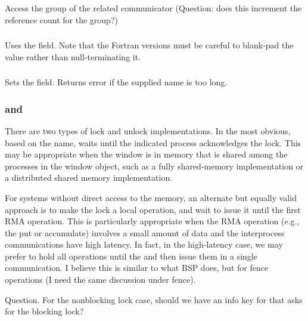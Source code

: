 \documentclass{article}
\begin{document}
\subsubsection{}
Access the group of the related communicator (Question: does this increment the
reference count for the group?)

\subsubsection{}
Uses the  field.  Note that the Fortran versions
must be careful to blank-pad the value rather than null-terminating it.

\subsubsection{}
Sets the  field.  Returns error if the supplied name
is too long. 

\subsubsection{ and }
There are two types of lock and unlock implementations.  In the most
obvious, based on the name,  waits until the
indicated process acknowledges the lock. This may be appropriate when the
window is in memory that is shared among the processes in the window
object, such as a fully shared-memory implementation or a distributed
shared memory implementation.

For systems without direct access to the memory, an alternate but
equally valid approach is to make the lock a local operation, and wait
to issue it until the first RMA operation.  This is particularly
appropriate when the RMA operation (e.g., the put or accumulate)
involves a small amount of data and the interprocess communications
have high latency.  In fact, in the high-latency case, we may prefer
to hold all operations until the  and then issue
them in a single communication.  I believe this is similar to what BSP
does, but for fence operations (I need the same discussion under fence).

Question.  For the nonblocking lock case, should we have an info key
for  that asks for the blocking lock?  
\end{document}
